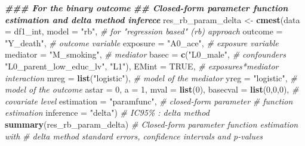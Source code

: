 \documentclass[
]{book}
\newenvironment{Shaded}{\begin{snugshade}}{\end{snugshade}}
\newcommand{\AttributeTok}[1]{\textcolor[rgb]{0.13,0.29,0.53}{#1}}
\newcommand{\CommentTok}[1]{\textcolor[rgb]{0.56,0.35,0.01}{\textit{#1}}}
\newcommand{\ConstantTok}[1]{\textcolor[rgb]{0.56,0.35,0.01}{#1}}
\newcommand{\DecValTok}[1]{\textcolor[rgb]{0.00,0.00,0.81}{#1}}
\newcommand{\DocumentationTok}[1]{\textcolor[rgb]{0.56,0.35,0.01}{\textbf{\textit{#1}}}}
\newcommand{\FunctionTok}[1]{\textcolor[rgb]{0.13,0.29,0.53}{\textbf{#1}}}
\newcommand{\NormalTok}[1]{#1}
\newcommand{\OtherTok}[1]{\textcolor[rgb]{0.56,0.35,0.01}{#1}}
\newcommand{\StringTok}[1]{\textcolor[rgb]{0.31,0.60,0.02}{#1}}
\begin{document}
\begin{Shaded}
\begin{Highlighting}[]
\DocumentationTok{\#\#\# For the binary outcome}
\DocumentationTok{\#\# Closed{-}form parameter function estimation and delta method inferece}
\NormalTok{res\_rb\_param\_delta }\OtherTok{\textless{}{-}} \FunctionTok{cmest}\NormalTok{(}\AttributeTok{data =}\NormalTok{ df1\_int,}
                            \AttributeTok{model =} \StringTok{"rb"}\NormalTok{, }\CommentTok{\# for "regression based" (rb) approach}
                            \AttributeTok{outcome =} \StringTok{"Y\_death"}\NormalTok{,        }\CommentTok{\# outcome variable}
                            \AttributeTok{exposure =} \StringTok{"A0\_ace"}\NormalTok{,      }\CommentTok{\# exposure variable}
                            \AttributeTok{mediator =} \StringTok{"M\_smoking"}\NormalTok{,   }\CommentTok{\# mediator}
                            \AttributeTok{basec =} \FunctionTok{c}\NormalTok{(}\StringTok{"L0\_male"}\NormalTok{,      }\CommentTok{\# confounders}
                                      \StringTok{"L0\_parent\_low\_educ\_lv"}\NormalTok{,}
                                      \StringTok{"L1"}\NormalTok{),}
                            \AttributeTok{EMint =} \ConstantTok{TRUE}\NormalTok{, }\CommentTok{\# exposures*mediator interaction}
                            \AttributeTok{mreg =} \FunctionTok{list}\NormalTok{(}\StringTok{"logistic"}\NormalTok{), }\CommentTok{\# model of the mediator}
                            \AttributeTok{yreg =} \StringTok{"logistic"}\NormalTok{,       }\CommentTok{\# model of the outcome}
                            \AttributeTok{astar =} \DecValTok{0}\NormalTok{,}
                            \AttributeTok{a =} \DecValTok{1}\NormalTok{,}
                            \AttributeTok{mval =} \FunctionTok{list}\NormalTok{(}\DecValTok{0}\NormalTok{),}
                            \AttributeTok{basecval =} \FunctionTok{list}\NormalTok{(}\DecValTok{0}\NormalTok{,}\DecValTok{0}\NormalTok{,}\DecValTok{0}\NormalTok{),      }\CommentTok{\# covariate level}
                            \AttributeTok{estimation =} \StringTok{"paramfunc"}\NormalTok{, }\CommentTok{\#  closed{-}form parameter}
                            \CommentTok{\# function estimation}
                            \AttributeTok{inference =} \StringTok{"delta"}\NormalTok{) }\CommentTok{\# IC95\% : delta method}
\FunctionTok{summary}\NormalTok{(res\_rb\_param\_delta)}
\CommentTok{\# Closed{-}form parameter function estimation with}
\CommentTok{\# delta method standard errors, confidence intervals and p{-}values}

\end{Highlighting}
\end{Shaded}
\end{document}
